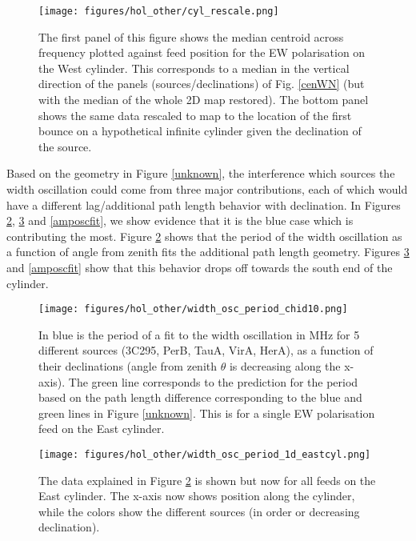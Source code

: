 \begin{figure}[h!]
\begin{center}
\texttt{[image: figures/hol\_other/cyl\_rescale.png]}
\end{center}
\caption{The first panel of this figure shows the median centroid across frequency plotted against feed position for the EW polarisation on the West cylinder. This corresponds to a median in the vertical direction of the panels (sources/declinations) of Fig. \ref{cenWN} (but with the median of the whole 2D map restored). The bottom panel shows the same data rescaled to map to the location of the first bounce on a hypothetical infinite cylinder given the declination of the source.}
\label{confirm}
\end{figure}

Based on the geometry in Figure \ref{unknown}, the interference which sources the width oscillation could come from three major contributions, each of which would have a different lag/additional path length behavior with declination. In Figures \ref{feed10}, \ref{widthoscfit} and \ref{amposcfit}, we show evidence that it is the blue case which is contributing the most. Figure \ref{feed10} shows that the period of the width oscillation as a function of angle from zenith fits the additional path length geometry. Figures \ref{widthoscfit} and \ref{amposcfit} show that this behavior drops off towards the south end of the cylinder.
\begin{figure}[h!]
\begin{center}
\texttt{[image: figures/hol\_other/width\_osc\_period\_chid10.png]}
\caption{In blue is the period of a fit to the width oscillation in MHz for 5 different sources (3C295, PerB, TauA, VirA, HerA), as a function of their declinations (angle from zenith $\theta$ is decreasing along the x-axis). The green line corresponds to the prediction for the period based on the path length difference corresponding to the blue and green lines in Figure \ref{unknown}. This is for a single EW polarisation feed on the East cylinder.}
\label{feed10}
\end{center}
\end{figure}

\begin{figure}[h!]
\begin{center}
\texttt{[image: figures/hol\_other/width\_osc\_period\_1d\_eastcyl.png]}
\caption{The data explained in Figure \ref{feed10} is shown but now for all feeds on the East cylinder. The x-axis now shows position along the cylinder, while the colors show the different sources (in order or decreasing declination).}
\label{widthoscfit}
\end{center}
\end{figure}

